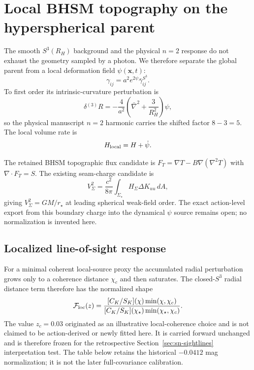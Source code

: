 \section{Local BHSM topography on the hyperspherical parent}
\label{sec:bhsm-los-topography}

The smooth $S^3(R_H)$ background and the physical $n=2$ response do not exhaust the geometry sampled by a photon. We therefore separate the global parent from a local deformation field $\psi(\mathbf x,t)$:
\begin{equation}
\gamma_{ij}=a^2 e^{2\psi}\bar\gamma^{S^3}_{ij}.
\end{equation}
To first order its intrinsic-curvature perturbation is
\begin{equation}
\delta{}^{(3)}R=-\frac{4}{a^2}\left(\bar\nabla^2+\frac{3}{R_H^2}\right)\psi,
\end{equation}
so the physical manuscript $n=2$ harmonic carries the shifted factor $8-3=5$.  The local volume rate is
\begin{equation}
H_{\rm local}=H+\dot\psi.
\end{equation}

The retained BHSM topographic flux candidate is $F_T=\nabla T-B\nabla(\nabla^2T)$ with $\nabla\cdot F_T=S$.  The existing seam-charge candidate is
\begin{equation}
V_\Sigma^2=\frac{c^2}{8\pi}\int_{\Sigma_\star}H_\Sigma\Delta K_{uu}\,dA,
\end{equation}
giving $V_\Sigma^2=GM/r_\star$ at leading spherical weak-field order.  The exact action-level export from this boundary charge into the dynamical $\psi$ source remains open; no normalization is invented here.

\subsection{Localized line-of-sight response}
For a minimal coherent local-source proxy the accumulated radial perturbation grows only to a coherence distance $\chi_c$ and then saturates.  The closed-$S^3$ radial distance term therefore has the normalized shape
\begin{equation}
\mathcal F_{\rm loc}(z)=\frac{[C_K/S_K](\chi)\min(\chi,\chi_c)}{[C_K/S_K](\chi_\star)\min(\chi_\star,\chi_c)}.
\end{equation}
The value $z_c=0.03$ originated as an illustrative local-coherence choice
and is not claimed to be action-derived or newly fitted here. It is carried
forward unchanged and is therefore frozen for the retrospective
Section~\ref{sec:sn-sightlines} interpretation test.
The table below retains the historical $-0.0412$ mag normalization;
it is not the later full-covariance calibration.

